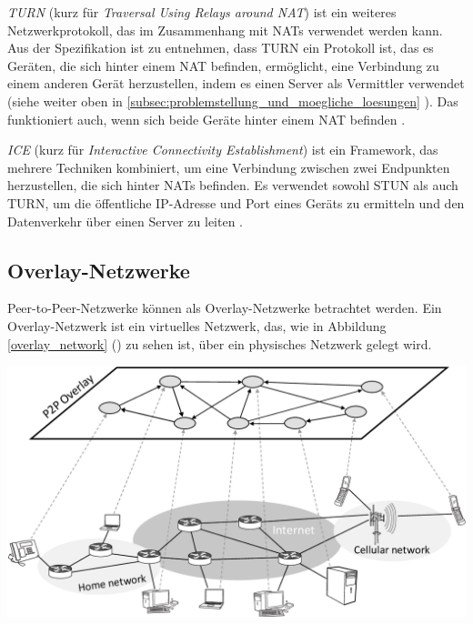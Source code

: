 \textit{TURN} (kurz für \textit{Traversal Using Relays around NAT}) ist ein weiteres Netzwerkprotokoll, das im Zusammenhang mit NATs verwendet werden kann. Aus der Spezifikation ist zu entnehmen, dass TURN ein Protokoll ist, das es Geräten, die sich hinter einem NAT befinden, ermöglicht, eine Verbindung zu einem anderen Gerät herzustellen, indem es einen Server als Vermittler verwendet (siehe weiter oben in \ref{subsec:problemstellung_und_moegliche_loesungen} ). Das funktioniert auch, wenn sich beide Geräte hinter einem NAT befinden \parencite[S. 7]{rfc8656_TURN}.

\textit{ICE} (kurz für \textit{Interactive Connectivity Establishment}) ist ein Framework, das mehrere Techniken kombiniert, um eine Verbindung zwischen zwei Endpunkten herzustellen, die sich hinter NATs befinden. Es verwendet sowohl STUN als auch TURN, um die öffentliche IP-Adresse und Port eines Geräts zu ermitteln und den Datenverkehr über einen Server zu leiten \Parencite[S. 6]{rfc8445_ICE}.


\subsection{Overlay-Netzwerke}

Peer-to-Peer-Netzwerke können als Overlay-Netzwerke betrachtet werden. Ein Overlay-Netzwerk ist ein virtuelles Netzwerk, das, wie in Abbildung \ref{overlay_network} (\textit{}) zu sehen ist, über ein physisches Netzwerk gelegt wird.

\begin{center}
    \captionsetup{type=figure}
    \includegraphics[width=0.9\linewidth]{images/overlay_network.png}
    \label{overlay_network}
\end{center}

